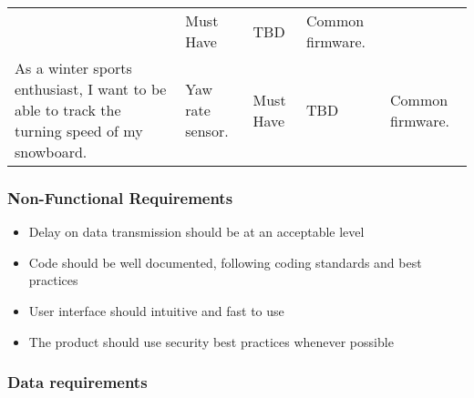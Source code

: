 \begin{longtable}[]{@{}lllll@{}}
\begin{minipage}[t]{0.18\columnwidth}
\end{minipage} & \begin{minipage}[t]{0.08\columnwidth}\raggedright
Must Have\strut
\end{minipage} & \begin{minipage}[t]{0.09\columnwidth}\raggedright
TBD\strut
\end{minipage} & \begin{minipage}[t]{0.14\columnwidth}\raggedright
Common firmware.\strut
\end{minipage}\tabularnewline
\begin{minipage}[t]{0.37\columnwidth}\raggedright
As a winter sports enthusiast, I want to be able to track the turning
speed of my snowboard.\strut
\end{minipage} & \begin{minipage}[t]{0.18\columnwidth}\raggedright
Yaw rate sensor.\strut
\end{minipage} & \begin{minipage}[t]{0.08\columnwidth}\raggedright
Must Have\strut
\end{minipage} & \begin{minipage}[t]{0.09\columnwidth}\raggedright
TBD\strut
\end{minipage} & \begin{minipage}[t]{0.14\columnwidth}\raggedright
Common firmware.\strut
\end{minipage}\tabularnewline
\bottomrule
\end{longtable}

\hypertarget{non-functional-requirements}{%
\subsubsection{Non-Functional
Requirements}\label{non-functional-requirements}}

\begin{itemize}
\tightlist
\item
  Delay on data transmission should be at an acceptable level
\item
  Code should be well documented, following coding standards and best
  practices
\item
  User interface should intuitive and fast to use
\item
  The product should use security best practices whenever possible
\end{itemize}

\hypertarget{data-requirements}{%
\subsubsection{Data requirements}\label{data-requirements}}

